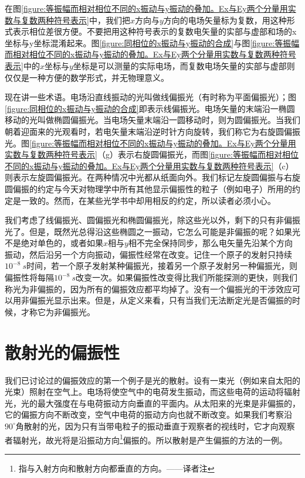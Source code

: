 在图\ref{figure:等振幅而相对相位不同的x振动与y振动的叠加。Ex与Ey两个分量用实数与复数两种符号表示}中，我们把$x$方向与$y$方向的电场矢量标为复数，用这种形式表示相位差很方便。不要把用这种符号表示的复数电矢量的实部与虚部和场的x坐标与y坐标混淆起来。图\ref{figure:同相位的x振动与y振动的合成}与图\ref{figure:等振幅而相对相位不同的x振动与y振动的叠加。Ex与Ey两个分量用实数与复数两种符号表示}中的$x$坐标与$y$坐标是可以测量的实际电场，而复数电场矢量的实部与虚部则仅仅是一种方便的数学形式，并无物理意义。

现在讲一些术语。电场沿直线振动的光叫做线偏振光（有时称为平面偏振光）；图\ref{figure:同相位的x振动与y振动的合成}即表示线偏振光。电场矢量的末端沿一椭圆移动的光叫做椭圆偏振光。当电场矢量末端沿一圆移动时，则为圆偏振光。当我们朝着迎面来的光观看时，若电矢量末端沿逆时针方向旋转，我们称它为右旋圆偏振光。图\ref{figure:等振幅而相对相位不同的x振动与y振动的叠加。Ex与Ey两个分量用实数与复数两种符号表示}（g）表示右旋圆偏振光，而图\ref{figure:等振幅而相对相位不同的x振动与y振动的叠加。Ex与Ey两个分量用实数与复数两种符号表示}（c）则表示左旋圆偏振光。在两种情况中光都从纸面向外。我们标记左旋圆偏振与右旋圆偏振的约定与今天对物理学中所有其他显示偏振性的粒子（例如电子）所用的约定是一致的。然而，在某些光学书中却用相反的约定，所以读者必须小心。

我们考虑了线偏振光、圆偏振光和椭圆偏振光，除这些光以外，剩下的只有非偏振光了。但是，既然光总得沿这些椭圆之一振动，它怎么可能是非偏振的呢？如果光不是绝对单色的，或者如果$x$相与$y$相不完全保持同步，那么电矢量先沿某个方向振动，然后沿另一个方向振动，偏振性经常在改变。记住一个原子的发射只持续$10^{-8}~s$时间，若一个原子发射某种偏振光，接着另一个原子发射另一种偏振光，则偏振性将每隔$10^{-8}~s$改变一次。如果偏振性改变得比我们所能探测的更快，则我们称光为非偏振的，因为所有的偏振效应都平均掉了。没有一个偏振光的干涉效应可以用非偏振光显示出来。但是，从定义来看，只有当我们无法断定光是否偏振的时候，才称它为非偏振光。

\section{散射光的偏振性}

我们已讨论过的偏振效应的第一个例子是光的散射。设有一束光（例如来自太阳的光束）照射在空气上。电场将使空气中的电荷发生振动，而这些电荷的运动将辐射光，光的最大强度在与电荷振动方向垂直的平面内。从太阳来的光束是非偏振的，它的偏振方向不断改变，空气中电荷的振动方向也就不断改变。如果我们考察沿$90^\circ$角散射的光，因为只有当带电粒子的振动垂直于观察者的视线时，它才向观察者辐射光，故光将是沿振动方向\footnote{指与入射方向和散射方向都垂直的方向。——译者注}偏振的。所以散射是产生偏振的方法的一例。

